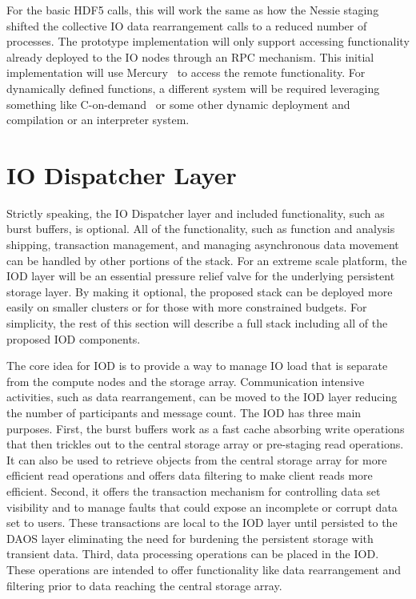 \documentclass[conference]{IEEEtran} \pdfpagewidth=8.5in
\begin{document}
For the basic HDF5 calls, this will work the same as how the Nessie
staging~\cite{lofstead:2011:nessie-staging} shifted the collective IO data
rearrangement calls to a reduced number of processes. The prototype
implementation will only support accessing functionality already deployed to
the IO nodes through an RPC mechanism. This initial implementation will use
Mercury~\cite{Soumagne:2013:mercury} to access the remote functionality. For
dynamically defined functions, a different system will be required leveraging
something like C-on-demand~\cite{abbasi:2011:c-on-demand} or some other dynamic
deployment and compilation or an interpreter system.

\section{IO Dispatcher Layer}
\label{sec:iod}

Strictly speaking, the IO Dispatcher layer and included functionality, such as
burst buffers, is optional. All of the functionality, such as function and
analysis shipping, transaction management, and managing asynchronous data
movement can be handled by other portions of the stack. For an extreme scale
platform, the IOD layer will be an essential pressure relief valve for the
underlying persistent storage layer. By making it optional, the proposed stack
can be deployed more easily on smaller clusters or for those with more
constrained budgets. For simplicity, the rest of this section will describe a
full stack including all of the proposed IOD components.

The core idea for IOD is to provide a way to manage IO load that is separate
from the compute nodes and the storage array. Communication intensive
activities, such as data rearrangement, can be moved to the IOD layer reducing
the number of participants and message count. The IOD has three main purposes.
First, the burst buffers work as a fast cache absorbing write operations that
then trickles out to the central storage array or pre-staging read operations.
It can also be used to retrieve objects from the central storage array for more
efficient read operations and offers data filtering to make client reads more
efficient.  Second, it offers the transaction mechanism for controlling data
set visibility and to manage faults that could expose an incomplete or corrupt
data set to users.  These transactions are local to the IOD layer until
persisted to the DAOS layer eliminating the need for burdening the persistent
storage with transient data.  Third, data processing operations can be placed
in the IOD.  These operations are intended to offer functionality like data
rearrangement and filtering prior to data reaching the central storage array.
\end{document}
